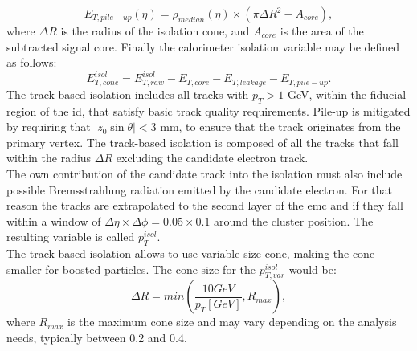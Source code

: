 	\begin{equation}
		E_{T,pile-up}(\eta)=\rho_{median}(\eta)\times(\pi \Delta R^2 - A_{core}),
	\end{equation}
	where $\Delta R$ is the radius of the isolation cone, and $A_{core}$ is the area of the subtracted signal core. Finally the calorimeter isolation variable may be defined as follows:
	\begin{equation}
		E^{isol}_{T,cone}=E^{isol}_{T,raw}-E_{T,core}-E_{T,leakage}-E_{T,pile-up}.
	\end{equation}
	The track-based isolation includes all tracks with $p_T>1$ GeV, within the fiducial region of the \gls{id}, that satisfy basic track quality requirements. Pile-up is mitigated by requiring that $|z_0\sin{\theta}|<3$ mm, to ensure that the track originates from the primary vertex. The track-based isolation is composed of all the tracks that fall within the radius $\Delta R$ excluding the candidate electron track.\\
	The own contribution of the candidate track into the isolation must also include possible Bremsstrahlung radiation emitted by the candidate electron. For that reason the tracks are extrapolated to the second layer of the \gls{emc} and if they fall within a window of $\Delta \eta \times \Delta \phi = 0.05 \times 0.1$ around the cluster position. The resulting variable is called $p_T^{isol}$.\\
	The track-based isolation allows to use variable-size cone, making the cone smaller for boosted particles. The cone size for the $p_{T,var}^{isol}$ would be:
	\begin{equation}
		\Delta R=min\left(\frac{10 GeV}{p_T[GeV]},R_{max}\right),
	\end{equation}
	where $R_{max}$ is the maximum cone size and may vary depending on the analysis needs, typically between 0.2 and 0.4.
